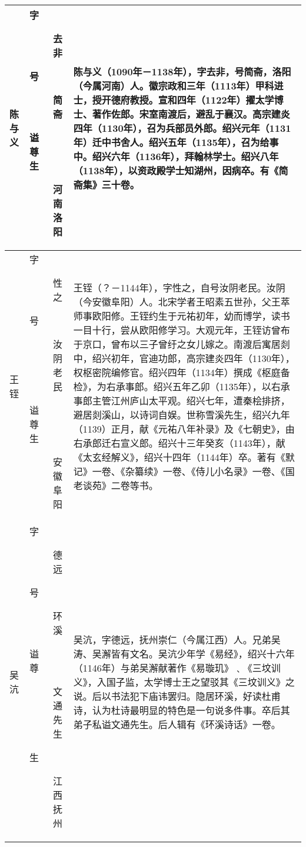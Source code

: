 \begin{longtable}{|>{\centering\namefont\heiti}m{2em}|>{\centering\tiny}m{3.0em}|>{\xzfont\kaiti}m{7.3em}|}
  陈与义 & \begin{description}
  \item[字] 去非
  \item[号] 简斋
  \item[谥] 
  \item[尊] 
  \item[生] 河南洛阳
  \end{description} & 陈与义（1090年－1138年），字去非，号简斋，洛阳（今属河南）人。徽宗政和三年（1113年）甲科进士，授开德府教授。宣和四年（1122年）擢太学博士、著作佐郎。宋室南渡后，避乱于襄汉。高宗建炎四年（1130年），召为兵部员外郎。绍兴元年（1131年）迁中书舍人。绍兴五年（1135年），召为给事中。绍兴六年（1136年），拜翰林学士。绍兴八年（1138年），以资政殿学士知湖州，因病卒。有《简斋集》三十卷。 \tabularnewline\hline
  王铚 & \begin{description}
  \item[字] 性之
  \item[号] 汝阴老民
  \item[谥] 
  \item[尊] 
  \item[生] 安徽阜阳
  \end{description} & 王铚（？－1144年），字性之，自号汝阴老民。汝阴（今安徽阜阳）人。北宋学者王昭素五世孙，父王萃师事欧阳修。王铚约生于元祐初年，幼而博学，读书一目十行，尝从欧阳修学习。大观元年，王铚访曾布于京口，曾布以三子曾纡之女儿嫁之。南渡后寓居剡中，绍兴初年，官迪功郎，高宗建炎四年（1130年），权枢密院编修官。绍兴四年（1134年）撰成《枢庭备检》，为右承事郎。绍兴五年乙卯（1135年），以右承事郎主管江州庐山太平观。绍兴七年，遭秦桧排挤，避居剡溪山，以诗词自娱。世称雪溪先生，绍兴九年（1139）正月，献《元祐八年补录》及《七朝史》，由右承郎迁右宣义郎。绍兴十三年癸亥（1143年），献《太玄经解义》，绍兴十四年（1144年）卒。著有《默记》一卷、《杂纂续》一卷、《侍儿小名录》一卷、《国老谈苑》二卷等书。 \tabularnewline\hline
  吴沆 & \begin{description}
  \item[字] 德远
  \item[号] 环溪
  \item[谥] 
  \item[尊] 文通先生
  \item[生] 江西抚州
  \end{description} & 吴沆，字德远，抚州崇仁（今属江西）人。兄弟吴涛、吴澥皆有文名。吴沆少年学《易经》，绍兴十六年（1146年）与弟吴澥献著作《易璇玑》﹑《三坟训义》，入国子监，太学博士王之望驳其《三坟训义》之说。后以书法犯下庙讳罢归。隐居环溪，好读杜甫诗，认为杜诗最明显的特色是一句说多件事。卒后其弟子私谥文通先生。后人辑有《环溪诗话》一卷。 \tabularnewline\hline

\end{longtable}

